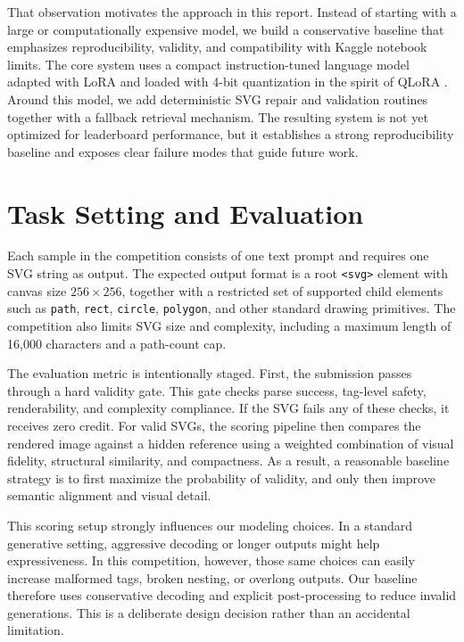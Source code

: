 \documentclass[11pt]{article}
\begin{document}
That observation motivates the approach in this report. Instead of starting with a large or computationally expensive model, we build a conservative baseline that emphasizes reproducibility, validity, and compatibility with Kaggle notebook limits. The core system uses a compact instruction-tuned language model adapted with LoRA \citep{hu2022lora} and loaded with 4-bit quantization in the spirit of QLoRA \citep{dettmers2023qlora}. Around this model, we add deterministic SVG repair and validation routines together with a fallback retrieval mechanism. The resulting system is not yet optimized for leaderboard performance, but it establishes a strong reproducibility baseline and exposes clear failure modes that guide future work.

\section{Task Setting and Evaluation}
Each sample in the competition consists of one text prompt and requires one SVG string as output. The expected output format is a root \texttt{<svg>} element with canvas size \(256 \times 256\), together with a restricted set of supported child elements such as \texttt{path}, \texttt{rect}, \texttt{circle}, \texttt{polygon}, and other standard drawing primitives. The competition also limits SVG size and complexity, including a maximum length of 16,000 characters and a path-count cap.

The evaluation metric is intentionally staged. First, the submission passes through a hard validity gate. This gate checks parse success, tag-level safety, renderability, and complexity compliance. If the SVG fails any of these checks, it receives zero credit. For valid SVGs, the scoring pipeline then compares the rendered image against a hidden reference using a weighted combination of visual fidelity, structural similarity, and compactness. As a result, a reasonable baseline strategy is to first maximize the probability of validity, and only then improve semantic alignment and visual detail.

This scoring setup strongly influences our modeling choices. In a standard generative setting, aggressive decoding or longer outputs might help expressiveness. In this competition, however, those same choices can easily increase malformed tags, broken nesting, or overlong outputs. Our baseline therefore uses conservative decoding and explicit post-processing to reduce invalid generations. This is a deliberate design decision rather than an accidental limitation.
\end{document}
